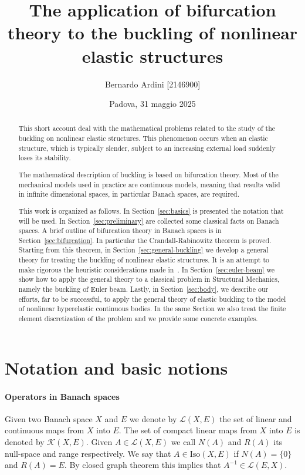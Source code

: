 \documentclass[a4paper,11pt]{article}
\theoremstyle{definition}
\begin{document}
\author{Bernardo Ardini [2146900]}
\date{Padova, 31 maggio 2025}
\title{\bfseries The application of bifurcation theory to the buckling of nonlinear elastic structures}

\maketitle

\begin{abstract}
This short account deal with the mathematical problems related to the study of the buckling on nonlinear elastic structures. This phenomenon occurs when an elastic structure, which is typically slender, subject to an increasing external load suddenly loses its stability.

The mathematical description of buckling is based on bifurcation theory. Most of the mechanical models used in practice are continuous models, meaning that results valid in infinite dimensional spaces, in particular Banach spaces, are required.

This work is organized as follows. In Section~\ref{sec:basics} is presented the notation that will be used. In Section~\ref{sec:preliminary} are collected some classical facts on Banach spaces. A brief outline of bifurcation theory in Banach spaces is in Section~\ref{sec:bifurcation}. In particular the Crandall-Rabinowitz theorem is proved. Starting from this theorem, in Section~\ref{sec:general-buckling} we develop a general theory for treating the buckling of nonlinear elastic structures. It is an attempt to make rigorous the heuristic considerations made in~\cite{casciaro}. In Section~\ref{sec:euler-beam} we show how to apply the general theory to a classical problem in Structural Mechanics, namely the buckling of Euler beam. Lastly, in Section~\ref{sec:body}, we describe our efforts, far to be successful, to apply the general theory of elastic buckling to the model of nonlinear hyperelastic continuous bodies. In the same Section we also treat the finite element discretization of the problem and we provide some concrete examples.
\end{abstract}

\tableofcontents

\section{Notation and basic notions}
\label{sec:basics}

\paragraph{Operators in Banach spaces} Given two Banach space $X$ and $E$ we denote by $\mathscr{L}(X,E)$ the set of linear and continuous maps from $X$ into $E$. The set of compact linear maps from $X$ into $E$ is denoted by $\mathscr{K}(X,E)$. Given $A\in\mathscr{L}(X,E)$ we call $N(A)$ and $R(A)$ its null-space and range respectively. We say that $A\in\text{Iso}(X,E)$ if $N(A)=\{0\}$ and $R(A)=E$. By closed graph theorem this implies that $A^{-1}\in\mathscr{L}(E,X)$.
\end{document}
